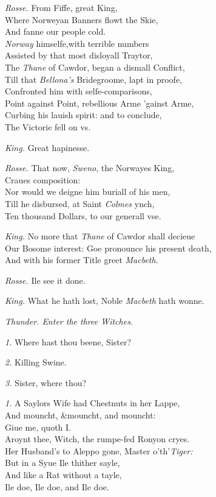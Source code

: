 \documentclass[12pt]{sides}
\newcommand{\dia}[1]{\hskip 15pt\textit{#1}\hskip 6pt}
\newcommand{\cstagedir}[1]{%
  \vspace{6pt}%
  \centerline{\textit{#1}}%
  \vspace{12pt}%
}
\begin{document}
\begin{multicols}{2}
			\dia{Rosse.} From Fiffe, great King, \\ Where Norweyan Banners flowt the Skie, \\ And fanne our people cold. \\ \textit{Norway} himselfe,with terrible numbers \\ Assisted by that most disloyall Traytor, \\ The \textit{Thane} of Cawdor, began a dismall Conflict, \\ Till that \textit{Bellona's} Bridegroome, lapt in proofe, \\ Confronted him with selfe-comparisons, \\ Point against Point, rebellious Arme 'gainst Arme, \\ Curbing his lauish spirit: and to conclude, \\ The Victorie fell on vs.
			
			\dia{King.} Great hapinesse.
			
			\dia{Rosse.} That now, \textit{Sweno}, the Norwayes King, \\ Craues composition: \\ Nor would we deigne him buriall of his men, \\ Till he disbursed, at Saint \textit{Colmes} ynch, \\ Ten thousand Dollars, to our generall vse.
			
			\dia{King.} No more that \textit{Thane} of Cawdor shall decieue \\ Our Bosome interest: Goe pronounce his present death, \\ And with his former Title greet \textit{Macbeth}.
			
			\dia{Rosse.} Ile see it done.
			
			\dia{King.} What he hath lost, Noble \textit{Macbeth} hath wonne.
			
			\cstagedir{Thunder. Enter the three Witches.}
			
			\dia{1.} Where hast thou beene, Sister?
			
			\dia{2.} Killing Swine.
			
			\dia{3.} Sister, where thou?
			
			\dia{1.} A Saylors Wife had Chestnuts in her Lappe, \\ And mouncht, \&mouncht, and mouncht: \\ Giue me, quoth I. \\ Aroynt thee, Witch, the rumpe-fed Ronyon cryes. \\ Her Husband's to Aleppo gone, Master o'th'\textit{Tiger:} \\ But in a Syue Ile thither sayle, \\ And like a Rat without a tayle, \\ Ile doe, Ile doe, and Ile doe.
			

\end{multicols}
\end{document}
